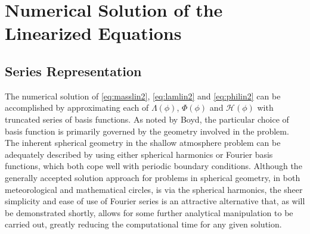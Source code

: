 \section{Numerical Solution of the Linearized Equations}
\subsection{Series Representation}
\label{subsec:incomplinser}
The numerical solution of \eqref{eq:masslin2}, \eqref{eq:lamlin2} and \eqref{eq:philin2} can be accomplished by approximating each of $\Lambda(\phi)$, $\Phi(\phi)$ and $\mathcal{H}(\phi)$ with truncated series of basis functions. As noted by Boyd\cite[page 109]{Boyd:CFSM}, the particular choice of basis function is primarily governed by the geometry involved in the problem. The inherent spherical geometry in the shallow atmosphere problem can be adequately described by using either spherical harmonics or Fourier basis functions, which both cope well with periodic boundary conditions. Although the generally accepted solution approach for problems in spherical geometry, in both meteorological and mathematical circles, is via the spherical harmonics, the sheer simplicity and ease of use of Fourier series is an attractive alternative that, as will be demonstrated shortly, allows for some further analytical manipulation to be carried out, greatly reducing the computational time for any given solution.

